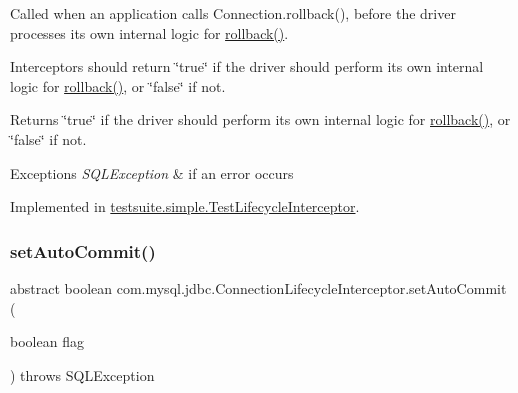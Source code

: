 Called when an application calls Connection.\+rollback(), before the driver processes its own internal logic for \mbox{\hyperlink{interfacecom_1_1mysql_1_1jdbc_1_1_connection_lifecycle_interceptor_a1e23e5b6724c8362009e5d87938507de}{rollback()}}.

Interceptors should return \char`\"{}true\char`\"{} if the driver should perform its own internal logic for \mbox{\hyperlink{interfacecom_1_1mysql_1_1jdbc_1_1_connection_lifecycle_interceptor_a1e23e5b6724c8362009e5d87938507de}{rollback()}}, or \char`\"{}false\char`\"{} if not.

\begin{DoxyReturn}{Returns}
\char`\"{}true\char`\"{} if the driver should perform its own internal logic for \mbox{\hyperlink{interfacecom_1_1mysql_1_1jdbc_1_1_connection_lifecycle_interceptor_a1e23e5b6724c8362009e5d87938507de}{rollback()}}, or \char`\"{}false\char`\"{} if not.
\end{DoxyReturn}

\begin{DoxyExceptions}{Exceptions}
{\em S\+Q\+L\+Exception} & if an error occurs \\
\hline
\end{DoxyExceptions}


Implemented in \mbox{\hyperlink{classtestsuite_1_1simple_1_1_test_lifecycle_interceptor_a75e431938104c0c3b8e1913b81ced992}{testsuite.\+simple.\+Test\+Lifecycle\+Interceptor}}.

\mbox{\label{interfacecom_1_1mysql_1_1jdbc_1_1_connection_lifecycle_interceptor_af86c9f877791fe2dded81722568863b7}} 
\subsubsection{\texorpdfstring{set\+Auto\+Commit()}{setAutoCommit()}}
{\footnotesize\ttfamily abstract boolean com.\+mysql.\+jdbc.\+Connection\+Lifecycle\+Interceptor.\+set\+Auto\+Commit (\begin{DoxyParamCaption}\item[{boolean}]{flag }\end{DoxyParamCaption}) throws S\+Q\+L\+Exception\hspace{0.3cm}{\ttfamily [abstract]}}

